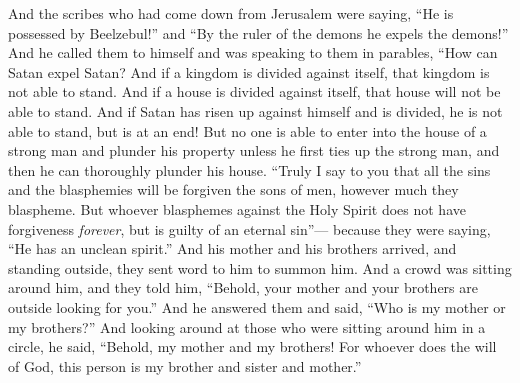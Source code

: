 \begin{biblechapter}
\verse And the scribes who had come down from Jerusalem were saying, “He is possessed by Beelzebul!” and “By the ruler of the demons he expels the demons!”
\verse And he called them to himself and was speaking to them in parables, “How can Satan expel Satan?
\verse And if a kingdom is divided against itself, that kingdom is not able to stand.
\verse And if a house is divided against itself, that house will not be able to stand.
\verse And if Satan has risen up against himself and is divided, he is not able to stand, but is at an end!
\verse But no one is able to enter into the house of a strong man and plunder his property unless he first ties up the strong man, and then he can thoroughly plunder his house.
\verse “Truly I say to you that all the sins and the blasphemies will be forgiven the sons of men, however much they blaspheme.
\verse But whoever blasphemes against the Holy Spirit does not have forgiveness \textit{forever}, but is guilty of an eternal sin”—
\verse because they were saying, “He has an unclean spirit.”
 And his mother and his brothers arrived, and standing outside, they sent word to him to summon him.
\verse And a crowd was sitting around him, and they told him, “Behold, your mother and your brothers are outside looking for you.”
\verse And he answered them and said, “Who is my mother or my brothers?”
\verse And looking around at those who were sitting around him in a circle, he said, “Behold, my mother and my brothers!
\verse For whoever does the will of God, this person is my brother and sister and mother.”
\end{biblechapter}

